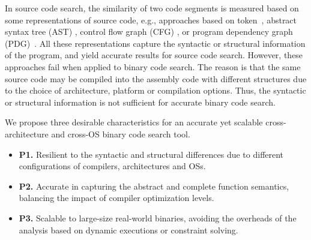 
In source code search, the similarity of two code segments is measured based on some representations of source code, e.g., approaches based on token~\cite{DBLP:journals/tse/KamiyaKI02}, abstract syntax tree (AST) \cite{DBLP:conf/icse/JiangMSG07}, control flow graph (CFG) \cite{DBLP:conf/qsic/ChanC14},  or program dependency graph (PDG)~\cite{DBLP:conf/icse/GabelJS08}. All these representations capture the syntactic or structural information of the program, and yield accurate results for source code search. However, these approaches fail when applied to binary code search. The reason is that the same source code may be compiled into the assembly code with different structures due to the choice of architecture, platform or compilation options. Thus, the syntactic or structural information is not sufficient for accurate binary code search.

We propose three desirable characteristics for an accurate yet scalable cross-architecture and cross-OS binary code search tool.
\begin{itemize}%
\itemsep0em
\item \textbf{P1.} Resilient to the syntactic and structural differences  due to different configurations of compilers, architectures and OSs.
\item \textbf{P2.} Accurate in capturing the abstract and complete function semantics, balancing the impact of compiler optimization levels.
\item \textbf{P3.} Scalable to large-size real-world binaries, avoiding the overheads of the analysis based on dynamic executions or constraint solving.
\end{itemize}


